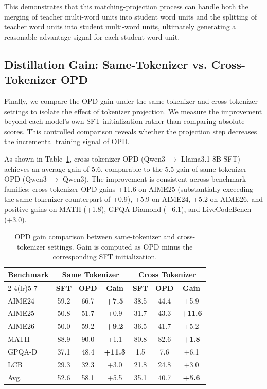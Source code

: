 \documentclass{article}
\theoremstyle{plain}
\theoremstyle{definition}
\theoremstyle{remark}
\begin{document}
This demonstrates that this matching-projection process can handle both the merging of teacher multi-word units into student word units and the splitting of teacher word units into student multi-word units, ultimately generating a reasonable advantage signal for each student word unit.


\subsection{Distillation Gain: Same-Tokenizer vs. Cross-Tokenizer OPD}
\label{sec:same_vs_cross}

Finally, we compare the OPD gain under the same-tokenizer and cross-tokenizer settings to isolate the effect of tokenizer projection. We measure the improvement beyond each model's own SFT initialization rather than comparing absolute scores. This controlled comparison reveals whether the projection step decreases the incremental training signal of OPD.

As shown in Table~\ref{tab:same_vs_cross}, cross-tokenizer OPD (Qwen3 $\rightarrow$ Llama3.1-8B-SFT) achieves an average gain of 5.6, comparable to the 5.5 gain of same-tokenizer OPD (Qwen3 $\rightarrow$ Qwen3). The improvement is consistent across benchmark families: cross-tokenizer OPD gains +11.6 on AIME25 (substantially exceeding the same-tokenizer counterpart of +0.9), +5.9 on AIME24, +5.2 on AIME26, and positive gains on MATH (+1.8), GPQA-Diamond (+6.1), and LiveCodeBench (+3.0).



\begin{table}[htbp]
    \centering
    \caption{OPD gain comparison between same-tokenizer and cross-tokenizer settings. Gain is computed as OPD minus the corresponding SFT initialization.}
    \begin{tabular*}{\linewidth}{l@{\extracolsep{\fill}}ccc|ccc}
    \toprule[1.3pt]
    \textbf{Benchmark} & \multicolumn{3}{c|}{\textbf{Same Tokenizer}} & \multicolumn{3}{c}{\textbf{Cross Tokenizer}} \\
    \cmidrule(lr){2-4}\cmidrule(lr){5-7}
    & \textbf{SFT} & \textbf{OPD} & \textbf{Gain} & \textbf{SFT} & \textbf{OPD} & \textbf{Gain} \\
    \midrule
    AIME24 & 59.2 & 66.7 & \textbf{+7.5} & 38.5 & 44.4 & +5.9 \\
    AIME25 & 50.8 & 51.7 & +0.9 & 31.7 & 43.3 & \textbf{+11.6} \\
    AIME26 & 50.0 & 59.2 & \textbf{+9.2} & 36.5 & 41.7 & +5.2 \\
    MATH & 88.9 & 90.0 & +1.1 & 80.8 & 82.6 & \textbf{+1.8} \\
    GPQA-D & 37.1 & 48.4 & \textbf{+11.3} & 1.5 & 7.6 & +6.1 \\
    LCB & 29.3 & 32.3 & +3.0 & 21.8 & 24.8 & +3.0 \\
    \midrule
    Avg. & 52.6 & 58.1 & +5.5 & 35.1 & 40.7 & \textbf{+5.6} \\
    \bottomrule
    \end{tabular*}
    \label{tab:same_vs_cross}
\end{table}
\end{document}
